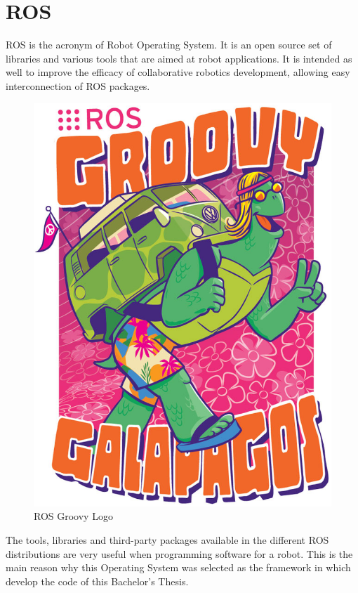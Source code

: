 \section{ROS}
\label{ros}

ROS is the acronym of Robot Operating System\cite{ros}. It is an open source set of libraries and various tools that are aimed at robot applications. It is intended as well to improve the efficacy of collaborative robotics development, allowing easy interconnection of ROS packages. 


\begin{figure}[h]
	\begin{center}
    \includegraphics[scale=0.3]{img/ros/groovy.eps}
	\caption[ROS Groovy Logo]{ROS Groovy Logo}
	\end{center}
\end{figure}

The tools, libraries and third-party packages available in the different ROS distributions are very useful when programming software for a robot. This is the main reason why this Operating System was selected as the framework in which develop the code of this Bachelor's Thesis. 
\\

